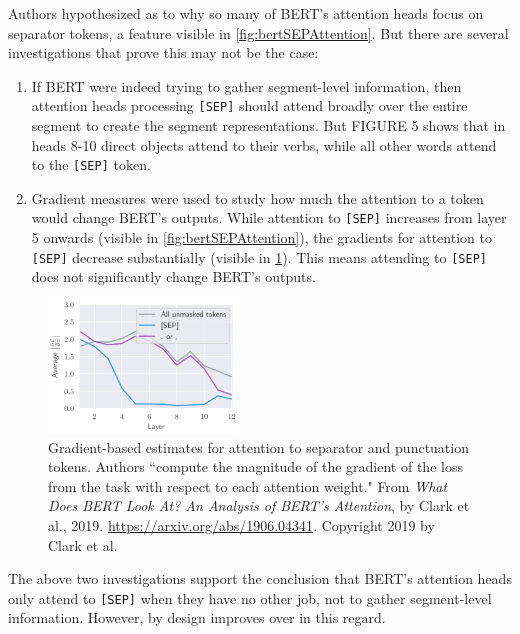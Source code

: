 Authors hypothesized as to why so many of BERT's attention heads focus on separator tokens, a feature visible in \cref{fig:bertSEPAttention}. But there are several investigations that prove this may not be the case: 
\begin{enumerate}
    \item If BERT were indeed trying to gather segment-level information, then attention heads processing \texttt{[SEP]} should attend broadly over the entire segment to create the segment representations. But FIGURE 5 shows that in heads 8-10 direct objects attend to their verbs, while all other words attend to the \texttt{[SEP]} token. 
    
    \item Gradient measures were used to study how much the attention to a token would change BERT's outputs. While attention to \texttt{[SEP]} increases from layer 5 onwards (visible in \cref{fig:bertSEPAttention}), the gradients for attention to \texttt{[SEP]} decrease substantially (visible in \cref{fig:bertGradient}). This means attending to \texttt{[SEP]} does not significantly change BERT's outputs. 
\end{enumerate}


\begin{figure}[h]
\vspace{-5pt}
\centering
\includegraphics[width=0.45\textwidth]{imgs/bert_attentionheads_gradient.png}
\vspace{-5pt}
\caption{\footnotesize Gradient-based estimates for attention to separator and punctuation tokens. Authors ``compute the magnitude of the gradient of the loss from the  task with respect to each attention weight." From \emph{What Does BERT Look At? An Analysis of BERT's Attention}, by Clark et al., 2019. \url{https://arxiv.org/abs/1906.04341}. Copyright 2019 by Clark et al.}
\vspace{-5pt}
\label{fig:bertGradient}
\end{figure}



The above two investigations support the conclusion that BERT's attention heads only attend to \texttt{[SEP]} when they have no other job, not to gather segment-level information. However,  by design improves over  in this regard. 









